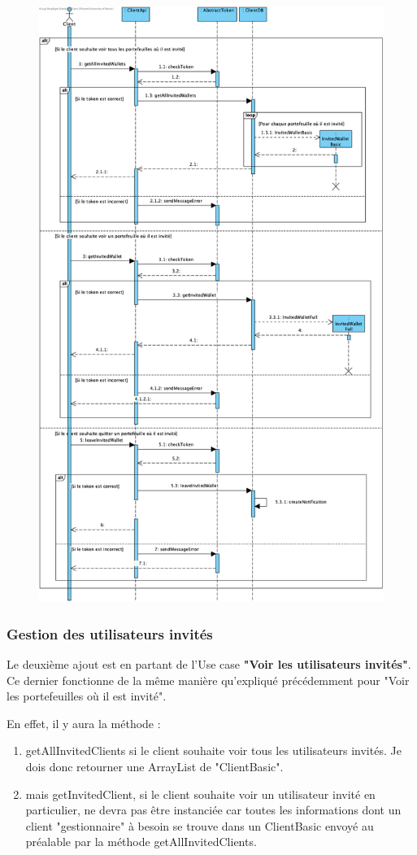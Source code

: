 \newpage
\begin{figure}[h]
\centering
\includegraphics[height = 1.2\textwidth]{Extension-claire/Sequence-claire/img/seqOuInvité.png}
\end{figure}

\newpage

\subsubsection{Gestion des utilisateurs invités}
\begin{flushleft}
Le deuxième ajout est en partant de l'Use case \textbf{"Voir les utilisateurs invités"}. Ce dernier fonctionne de la même manière qu'expliqué précédemment pour "Voir les portefeuilles où il est invité".
\end{flushleft}
\begin{flushleft}
En effet, il y aura la méthode : 
\end{flushleft}
\begin{enumerate}
\item getAllInvitedClients si le client souhaite voir tous les utilisateurs invités. Je dois donc retourner une ArrayList de "ClientBasic".
\item mais getInvitedClient, si le client souhaite voir un utilisateur invité en particulier, ne devra pas être instanciée car toutes les informations dont un client "gestionnaire" à besoin se trouve dans un ClientBasic envoyé au préalable par la méthode getAllInvitedClients.
\end{enumerate}

